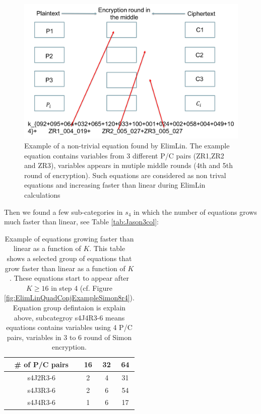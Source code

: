 \begin{figure}[h!]
	\vspace{-0.2cm}
	\centering
	\includegraphics*[width=150mm]{./pics/ElimLinDeep.png}
	\caption[Example of a non-trivial equation found by ElimLin]{Example of a non-trivial equation found by ElimLin. The example equation contains variables from 3 different P/C pairs (ZR1,ZR2 and ZR3), variables appears in mutiple middle rounds (4th and 5th round of encryption). Such equations are considered as non trival equations and increasing faster than linear during ElimLin calculations}
	\label{fig:DeepLin1}
	\vspace{-0.1cm}
\end{figure}

Then we found a few sub-categories in $s_4$ in which the number of equations grows much faster than linear, see Table \ref{tab:Jason3col}:

\begin{table}[h!]
	\caption[Example of equations growing faster than linear as a function of $K$]{Example of equations growing faster than linear as a function of $K$. This table shows a selected group of equations that grow faster than linear as a function of $K$. These equations start to appear after $K \geq 16$ in step 4 (cf. Figure \ref{fig:ElimLinQuadConjExampleSimon8r4}). Equation group defintaion is explain above, subcategroy s4J4R3-6 means equations contains variables using 4 P/C pairs, variables in 3 to 6 round of Simon encryption.  }\label{tab:Jason3col} \centering
	\label{Tab:SplitS4in3main}
\begin{tabular}{|c|c|c|c|}
	\hline
	\# of P/C pairs& 16 & 32 & 64 \\ \hline
	s4J2R3-6 & 2  & 4  & 31 \\ \hline
	s4J3R3-6 & 2  & 6  & 54 \\ \hline
	s4J4R3-6 & 1  & 6  & 17 \\ \hline
\end{tabular}
\end{table}

